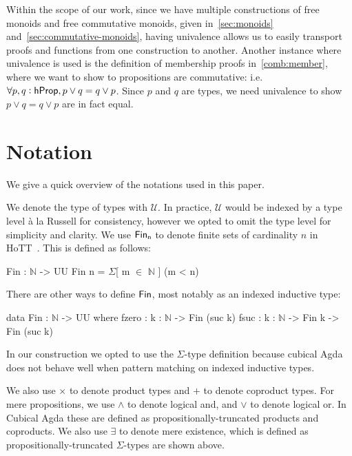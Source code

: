 Within the scope of our work, since we have multiple constructions of free monoids
and free commutative monoids, given in~\cref{sec:monoids} and~\cref{sec:commutative-monoids},
having univalence allows us to easily transport proofs and functions from one construction to another.
Another instance where univalence is used is the definition of membership proofs in~\cref{comb:member},
where we want to show to propositions are commutative: i.e. $\forall p, q: \mathsf{hProp}, p \vee q = q \vee p$.
Since $p$ and $q$ are types, we need univalence to show $p \vee q = q \vee p$ are in fact equal.

\section{Notation}\label{sec:notation}
We give a quick overview of the notations used in this paper.

We denote the type of types with $\mathcal{U}$. 
In practice, $\mathcal{U}$ would be indexed by a type level 
à la Russell for consistency, however we opted to omit the type level
for simplicity and clarity.
We use $\Fin[n]$ to denote finite sets of cardinality $n$ in HoTT~\cite{yorgeyCombinatorialSpeciesLabelled2014a}.
This is defined as follows:

\begin{code}
Fin : $\mathbb{N}$ -> UU
Fin n = $\Sigma$[ m $\in$ $\mathbb{N}$ ] (m < n)
\end{code}

There are other ways to define $\Fin$, most notably as an indexed inductive type:
\begin{code}
data Fin : $\mathbb{N}$ -> UU where
    fzero : {k : $\mathbb{N}$} -> Fin (suc k)
    fsuc : {k : $\mathbb{N}$} -> Fin k -> Fin (suc k)
\end{code}


In our construction we opted to use the $\Sigma$-type definition
because cubical Agda does not behave well
when pattern matching on indexed inductive types.

We also use $\times$ to denote product types and $+$ to denote coproduct types.
For mere propositions, we use $\land$ to denote logical and, and $\vee$ to denote logical or.
In Cubical Agda these are defined as propositionally-truncated products and coproducts.
We also use $\exists$ to denote mere existence, which is defined as
propositionally-truncated $\Sigma$-types are shown above.
